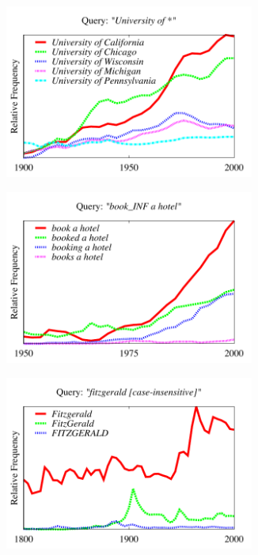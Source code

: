 \documentclass[11pt]{article}
\begin{document}
\begin{figure}[!t]
\begin{subfigure}
  \centering
\includegraphics[width=0.9\textwidth]{graphs/university}\\
\end{subfigure}%
\begin{subfigure}
\centering
\includegraphics[width=0.9\textwidth]{graphs/book}\\
\end{subfigure}%
\begin{subfigure}
\centering
\includegraphics[width=0.9\textwidth]{graphs/fitzgerald}\\

\end{subfigure}
\end{figure}
\end{document}
